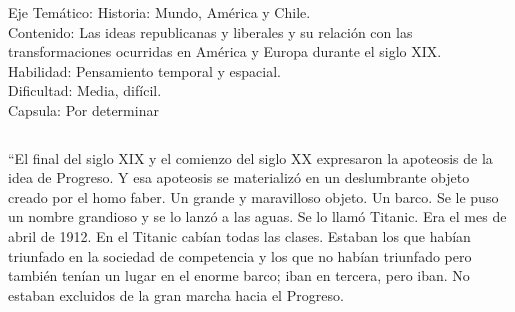 \documentclass[letterpaper,11pt]{article}
\newcommand{\anchopregunta}{0.9\textwidth}
\begin{document}
\begin{enumerate}
\begin{minipage}{\anchopregunta}
\begin{info}
\begin{flushleft}
Eje Temático: Historia: Mundo, América y Chile.\\
Contenido: Las ideas republicanas y liberales y su relación con las transformaciones ocurridas en América y Europa durante el siglo XIX.\\
Habilidad: Pensamiento temporal y espacial.\\
Dificultad: Media, difícil.\\
Capsula: Por determinar \\
\end{flushleft} 
\end{info}
\end{minipage}\vfill$\;$ %

\begin{minipage}{\anchopregunta}
\item ``El final del siglo XIX y el comienzo del siglo XX expresaron la apoteosis de la idea de Progreso. Y esa apoteosis se materializó en un deslumbrante objeto creado por el homo faber. Un grande y maravilloso objeto. Un barco. Se le puso un nombre grandioso y se lo lanzó a las aguas. Se lo llamó Titanic. Era el mes de abril de 1912. En el Titanic cabían todas las clases. Estaban los que habían triunfado en la sociedad de competencia y los que no habían triunfado pero también tenían un lugar en el enorme barco; iban en tercera, pero iban. No estaban excluidos de la gran marcha hacia el Progreso.


\end{minipage}
\end{enumerate}
\end{document}
